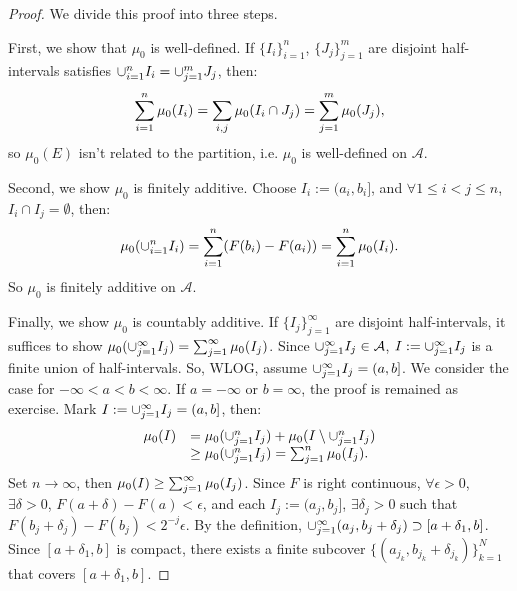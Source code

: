 \begin{proof}
    We divide this proof into three steps.

    First, we show that $\mu_{0}$ is well-defined. 
    If $\{I_i\}_{i=1}^{n}$, $\{J_{j}\}_{j=1}^{m}$ are disjoint 
    half-intervals satisfies $\cup_{i=1}^{n}I_i=\cup_{j=1}^{m}J_j$, 
    then:
    \begin{displaymath}
        \sum_{i=1}^{n}\mu_{0}(I_{i})
        =\sum_{i,j}\mu_{0}(I_i\cap J_j)
        =\sum_{j=1}^{m}\mu_{0}(J_j),
    \end{displaymath}
    so $\mu_0(E)$ isn't related to the partition, i.e. 
    $\mu_{0}$ is well-defined on $\mathcal{A}$. 

    Second, we show $\mu_{0}$ is finitely additive. 
    Choose $I_{i}:=(a_i,b_i]$, and $\forall 1\le i<j\le n$, 
    $I_i\cap I_j=\emptyset$, then:
    \begin{displaymath}
        \mu_{0}(\cup_{i=1}^{n}I_{i})
        =\sum_{i=1}^{n}(F(b_i)-F(a_i))
        =\sum_{i=1}^{n}\mu_{0}(I_i).
    \end{displaymath}
    So $\mu_{0}$ is finitely additive on $\mathcal{A}$.

    Finally, we show $\mu_{0}$ is countably additive. 
    If $\{I_{j}\}_{j=1}^{\infty}$ are disjoint half-intervals, 
    it suffices to show 
    $\mu_{0}(\cup_{j=1}^{\infty}I_j)=\sum_{j=1}^{\infty}\mu_{0}(I_j)$. 
    Since $\cup_{j=1}^{\infty}I_{j}\in\mathcal{A}$, 
    $I:=\cup_{j=1}^{\infty}I_{j}$ is a finite union of 
    half-intervals. 
    So, WLOG, assume $\cup_{j=1}^{\infty}I_j=(a,b]$. 
    We consider the case for $-\infty<a<b<\infty$. If 
    $a=-\infty$ or $b=\infty$, the proof is remained as exercise. 
    Mark $I:=\cup_{j=1}^{\infty}I_j=(a,b]$, then:
    \begin{displaymath}
        \begin{array}{rl}
        \mu_{0}(I)&=\mu_{0}(\cup_{j=1}^{n}I_j)+\mu_{0}(I\setminus\cup_{j=1}^{n}I_j)\\
        &\ge\mu_{0}(\cup_{j=1}^{n}I_j)=\sum_{j=1}^{n}\mu_{0}(I_j).
        \end{array}
    \end{displaymath}
    Set $n\rightarrow\infty$, then 
    $\mu_{0}(I)\ge\sum_{j=1}^{\infty}\mu_{0}(I_j)$. 
    Since $F$ is right continuous, $\forall\epsilon>0$, 
    $\exists\delta>0$, $F(a+\delta)-F(a)<\epsilon$, 
    and each $I_j:=(a_j,b_j]$, $\exists \delta_j>0$ such that 
    $F(b_j+\delta_j)-F(b_j)<2^{-j}\epsilon$. 
    By the definition, $\cup_{j=1}^{\infty}(a_j,b_j+\delta_j)
    \supset[a+\delta_1,b]$. Since $[a+\delta_1,b]$ is compact, 
    there exists a finite subcover 
    $\{(a_{j_{k}},b_{j_k}+\delta_{j_k})\}_{k=1}^{N}$ 
    that covers $[a+\delta_1,b]$. 


\end{proof}
